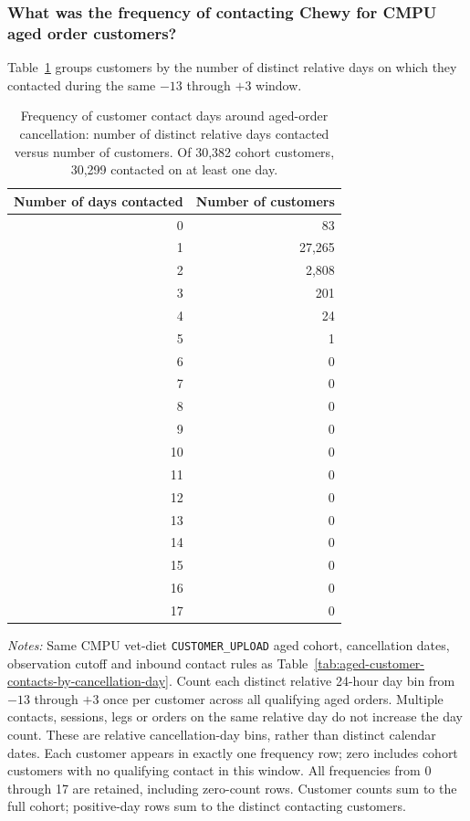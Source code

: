 \clearpage
\subsubsection{What was the frequency of contacting Chewy for CMPU aged order customers?}
Table~\ref{tab:aged-customer-contact-day-frequency} groups customers by the
number of distinct relative days on which they contacted during the same
$-13$ through $+3$ window.
\begin{table}[!htbp]
\centering
\caption{Frequency of customer contact days around aged-order cancellation: number of distinct relative days contacted versus number of customers. Of 30,382 cohort customers, 30,299 contacted on at least one day.}
\label{tab:aged-customer-contact-day-frequency}
\begin{tabular}{@{}rr@{}}
\toprule
Number of days contacted & Number of customers \\
\midrule
0 & 83 \\
1 & 27,265 \\
2 & 2,808 \\
3 & 201 \\
4 & 24 \\
5 & 1 \\
6 & 0 \\
7 & 0 \\
8 & 0 \\
9 & 0 \\
10 & 0 \\
11 & 0 \\
12 & 0 \\
13 & 0 \\
14 & 0 \\
15 & 0 \\
16 & 0 \\
17 & 0 \\
\bottomrule
\end{tabular}

\begin{minipage}{\linewidth}
\footnotesize
\textit{Notes:} Same CMPU vet-diet \texttt{CUSTOMER\_UPLOAD} aged cohort,
cancellation dates, observation cutoff and inbound contact rules as
Table~\ref{tab:aged-customer-contacts-by-cancellation-day}.
Count each distinct relative 24-hour day bin from $-13$ through $+3$ once
per customer across all qualifying aged orders. Multiple contacts, sessions,
legs or orders on the same relative day do not increase the day count.
These are relative cancellation-day bins, rather than distinct calendar dates.
Each customer appears in exactly one frequency row; zero includes cohort
customers with no qualifying contact in this window. All frequencies from
0 through 17 are retained, including zero-count rows. Customer counts sum to
the full cohort; positive-day rows sum to the distinct contacting customers.
\end{minipage}
\end{table}






